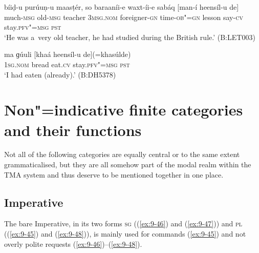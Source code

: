 \begin{exe}
\ex
\label{ex:9-43}
\gll bíiḍ-u purúuṇ-u maasṭér, so baraaníi-e waxt-íi-e sabáq [man-í heensíl-u de] \\
much-\textsc{msg} old-\textsc{msg} teacher 3\textsc{msg.nom}  foreigner-\textsc{gn}
time-\textsc{ob"=gn} lesson say-\textsc{cv} stay.\textsc{pfv"=msg} \textsc{pst} \\
\glt `He was a~very old teacher, he had studied during the British rule.' (B:LET003)

\ex
\label{ex:9-44}
\gll ma ɡúuli [khaá heensíl-u de](=khasúlde) \\
\textsc{1sg.nom} bread eat.\textsc{cv} stay.\textsc{pfv"=msg} \textsc{pst}  \\
\glt `I had eaten (already).' (B:DH5378)
\end{exe}

\section{Non"=indicative finite categories and their functions}
\label{sec:9-2}


Not all of the following categories are equally central or to the same extent grammaticalised, but they are all somehow part of the modal realm within the TMA system and thus deserve to be mentioned together in one place.


\subsection{Imperative}
\label{subsec:9-2-1}

The bare Imperative, in its two forms \textsc{sg} ((\ref{ex:9-46}) and (\ref{ex:9-47})) and \textsc{pl (}(\ref{ex:9-45}) and (\ref{ex:9-48})\textsc{)}, is mainly used for commands (\ref{ex:9-45}) and not overly polite requests (\ref{ex:9-46})--(\ref{ex:9-48}).

